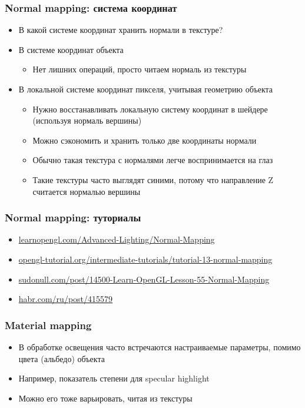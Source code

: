 \documentclass{beamer}
\begin{document}
\begin{frame}[fragile]
\frametitle{Normal mapping: система координат}
\begin{itemize}
\item В какой системе координат хранить нормали в текстуре?
\pause
\item В системе координат объекта
\begin{itemize}
\item Нет лишних операций, просто читаем нормаль из текстуры
\end{itemize}
\pause
\item В локальной системе координат пикселя, учитывая геометрию объекта
\begin{itemize}
\item Нужно восстанавливать локальную систему координат в шейдере (используя нормаль вершины)
\item Можно сэкономить и хранить только две координаты нормали
\item Обычно такая текстура с нормалями легче воспринимается на глаз
\pause
\item Такие текстуры часто выглядят синими, потому что направление Z считается нормалью вершины
\end{itemize}
\end{itemize}
\end{frame}

\begin{frame}[fragile]
\frametitle{Normal mapping: туториалы}
\begin{itemize}
\item \href{https://learnopengl.com/Advanced-Lighting/Normal-Mapping}{learnopengl.com/Advanced-Lighting/Normal-Mapping}
\item \href{http://www.opengl-tutorial.org/intermediate-tutorials/tutorial-13-normal-mapping}{opengl-tutorial.org/intermediate-tutorials/tutorial-13-normal-mapping}
\item \href{https://sudonull.com/post/14500-Learn-OpenGL-Lesson-55-Normal-Mapping}{sudonull.com/post/14500-Learn-OpenGL-Lesson-55-Normal-Mapping}
\item \href{https://habr.com/ru/post/415579}{habr.com/ru/post/415579}
\end{itemize}
\end{frame}

\begin{frame}[fragile]
\frametitle{Material mapping}
\begin{itemize}
\item В обработке освещения часто встречаются настраиваемые параметры, помимо цвета (альбедо) объекта
\pause
\item Например, показатель степени для specular highlight
\pause
\item Можно его тоже варьировать, читая из текстуры
\end{itemize}
\end{frame}
\end{document}
